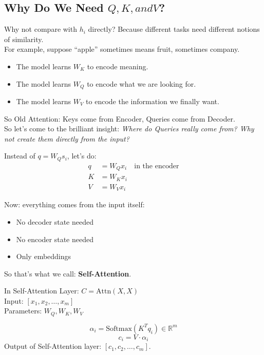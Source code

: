 \subsection{Why Do We Need \texorpdfstring{$Q, K, and V$}{Q, K, and V}?}
Why not compare with $h_i$ directly? Because different tasks need different notions of similarity. \\
For example, suppose “apple” sometimes means fruit, sometimes company.
\begin{itemize}
    \item The model learns $W_K$ to encode meaning.
    \item The model learns $W_Q$ to encode what we are looking for.
    \item The model learns $W_V$ to encode the information we finally want.
\end{itemize}

So Old Attention: Keys come from Encoder, Queries come from Decoder. \\
So let's come to the brilliant insight: \textit{Where do Queries really come from? Why not create them directly from the input?}

Instead of $q = W_Q s_i$, let's do:
\begin{align}
q &= W_Q x_i \quad \text{in the encoder} \\
K &= W_K x_i \\
V &= W_V x_i
\end{align}

Now: everything comes from the input itself:
\begin{itemize}
    \item No decoder state needed
    \item No encoder state needed
    \item Only embeddings
\end{itemize}

So that's what we call: \textbf{Self-Attention}.

In Self-Attention Layer: $C = \text{Attn}(X, X)$ \\
Input: $[x_1, x_2, \dots, x_m]$ \\
Parameters: $W_Q, W_K, W_V$

\begin{equation}
\alpha_i = \text{Softmax}(K^T q_i) \in \mathbb{R}^m
\end{equation}
\begin{equation}
c_i = V \cdot \alpha_i
\end{equation}
Output of Self-Attention layer: $[c_1, c_2, \dots, c_m]$.

